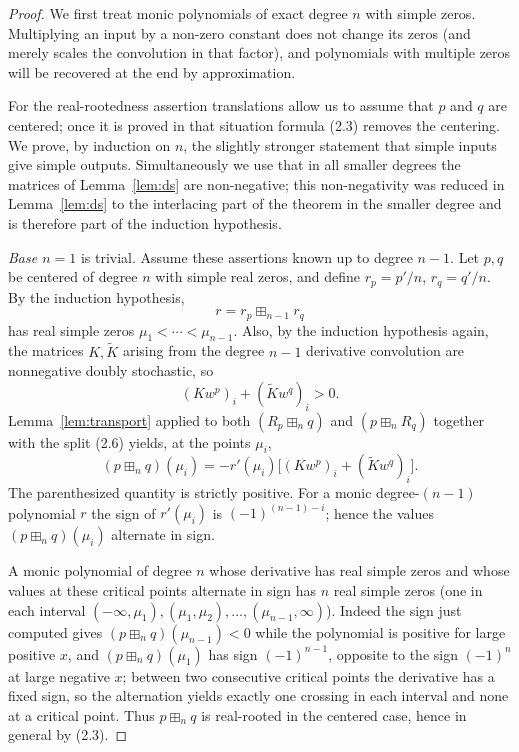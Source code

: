 \documentclass{article}
\begin{document}
\begin{proof}
We first treat monic polynomials of exact degree $n$ with simple zeros. Multiplying an input by a non-zero constant does not change its zeros (and merely scales the convolution in that factor), and polynomials with multiple zeros will be recovered at the end by approximation.

For the real-rootedness assertion translations allow us to assume that $p$ and $q$ are centered; once it is proved in that situation formula (2.3) removes the centering. We prove, by induction on $n$, the slightly stronger statement that simple inputs give simple outputs. Simultaneously we use that in all smaller degrees the matrices of Lemma~\ref{lem:ds} are non-negative; this non-negativity was reduced in Lemma~\ref{lem:ds} to the interlacing part of the theorem in the smaller degree and is therefore part of the induction hypothesis.

\textit{Base $n=1$} is trivial. Assume these assertions known up to degree $n-1$. Let $p, q$ be centered of degree $n$ with simple real zeros, and define $r_p = p'/n$, $r_q = q'/n$. By the induction hypothesis,
\[
  r = r_p \boxplus_{n-1} r_q
\]
has real simple zeros $\mu_1 < \cdots < \mu_{n-1}$. Also, by the induction hypothesis again, the matrices $K, \widetilde{K}$ arising from the degree $n-1$ derivative convolution are nonnegative doubly stochastic, so
\[
  (K w^p)_i + (\widetilde{K} w^q)_i > 0.
\]
Lemma~\ref{lem:transport} applied to both $(R_p \boxplus_n q)$ and $(p \boxplus_n R_q)$ together with the split (2.6) yields, at the points $\mu_i$,
\begin{equation}
  (p \boxplus_n q)(\mu_i) = -r'(\mu_i)\bigl[(K w^p)_i + (\widetilde{K} w^q)_i\bigr]. \tag{2.19}
\end{equation}
The parenthesized quantity is strictly positive. For a monic degree-$(n-1)$ polynomial $r$ the sign of $r'(\mu_i)$ is $(-1)^{(n-1)-i}$; hence the values $(p \boxplus_n q)(\mu_i)$ alternate in sign.

A monic polynomial of degree $n$ whose derivative has real simple zeros and whose values at these critical points alternate in sign has $n$ real simple zeros (one in each interval $(-\infty, \mu_1), (\mu_1, \mu_2), \ldots, (\mu_{n-1}, \infty)$). Indeed the sign just computed gives $(p \boxplus_n q)(\mu_{n-1}) < 0$ while the polynomial is positive for large positive $x$, and $(p \boxplus_n q)(\mu_1)$ has sign $(-1)^{n-1}$, opposite to the sign $(-1)^n$ at large negative $x$; between two consecutive critical points the derivative has a fixed sign, so the alternation yields exactly one crossing in each interval and none at a critical point. Thus $p \boxplus_n q$ is real-rooted in the centered case, hence in general by (2.3).


\end{proof}
\end{document}
